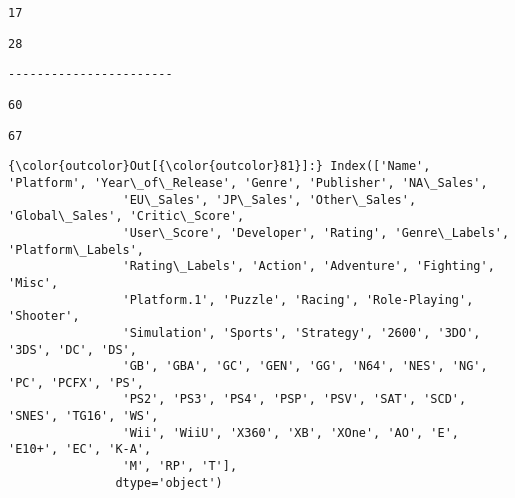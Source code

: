 \documentclass[11pt]{article}
\begin{document}
    
    \begin{verbatim}
17
    \end{verbatim}

    
    
    \begin{verbatim}
28
    \end{verbatim}

    
    \begin{Verbatim}[commandchars=\\\{\}]
-----------------------

    \end{Verbatim}

    
    \begin{verbatim}
60
    \end{verbatim}

    
    
    \begin{verbatim}
67
    \end{verbatim}

    
\begin{Verbatim}[commandchars=\\\{\}]
{\color{outcolor}Out[{\color{outcolor}81}]:} Index(['Name', 'Platform', 'Year\_of\_Release', 'Genre', 'Publisher', 'NA\_Sales',
                'EU\_Sales', 'JP\_Sales', 'Other\_Sales', 'Global\_Sales', 'Critic\_Score',
                'User\_Score', 'Developer', 'Rating', 'Genre\_Labels', 'Platform\_Labels',
                'Rating\_Labels', 'Action', 'Adventure', 'Fighting', 'Misc',
                'Platform.1', 'Puzzle', 'Racing', 'Role-Playing', 'Shooter',
                'Simulation', 'Sports', 'Strategy', '2600', '3DO', '3DS', 'DC', 'DS',
                'GB', 'GBA', 'GC', 'GEN', 'GG', 'N64', 'NES', 'NG', 'PC', 'PCFX', 'PS',
                'PS2', 'PS3', 'PS4', 'PSP', 'PSV', 'SAT', 'SCD', 'SNES', 'TG16', 'WS',
                'Wii', 'WiiU', 'X360', 'XB', 'XOne', 'AO', 'E', 'E10+', 'EC', 'K-A',
                'M', 'RP', 'T'],
               dtype='object')
\end{Verbatim}
            
\end{document}
